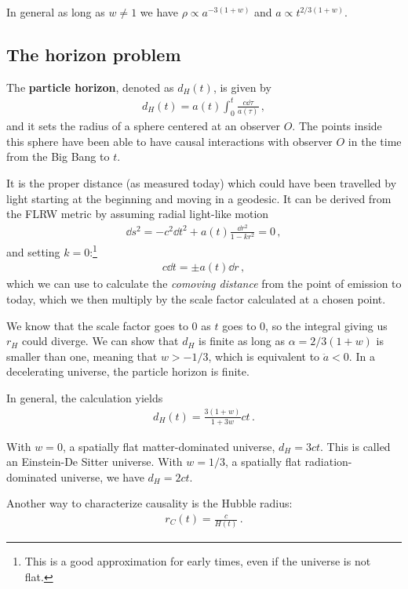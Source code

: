 \documentclass[main.tex]{subfiles}
\begin{document}
In general as long as \(w \neq 1\) we have \(\rho \propto a^{-3(1+w)}\) and \(a \propto t^{2 / 3 (1+w)}\).

\subsection{The horizon problem}

The \textbf{particle horizon}, denoted as \(d_H (t)\), is given by 
%
\begin{align}
d_H (t) = a(t) \int_{0}^{t} \frac{c \dd{\tau }}{a(\tau )}
\,,
\end{align}
%
and it sets the radius of a sphere centered at an observer \(O\). The points inside this sphere have been able to have causal interactions with observer \(O\) in the time from the Big Bang to \(t\).

It is the proper distance (as measured today) which could have been travelled by light starting at the beginning and moving in a geodesic. 
It can be derived from the FLRW metric by assuming radial light-like motion
%
\begin{align}
\dd{s}^2 = - c^2 \dd{t}^2 + a(t)\frac{ \dd{r}^2}{1 - kr^2} = 0
\,,
\end{align}
%
and setting \(k = 0\):\footnote{This is a good approximation for early times, even if the universe is not flat.}
%
\begin{align}
c \dd{t} = \pm  a(t) \dd{r}
\,,
\end{align}
%
which we can use to calculate the \emph{comoving distance} from the point of emission to today, which we then multiply by the scale factor calculated at a chosen point. 

We know that the scale factor goes to 0 as \(t\) goes to 0, so the integral giving us \(r_H\) could diverge. We can show that \(d_H\) is finite as long as \(\alpha = 2 / 3 (1+w)\) is smaller than one, meaning that \(w > - 1/3\), which is equivalent to \(\ddot{a} < 0\).
In a decelerating universe, the particle horizon is finite.

In general, the calculation yields
%
\begin{align}
d_H (t) = \frac{3(1 +w)}{1 + 3w} ct
\,.
\end{align}

With \(w = 0\), a spatially flat matter-dominated universe, \(d_H = 3 ct\). This is called an Einstein-De Sitter universe. 
With \(w = 1/3\), a spatially flat radiation-dominated universe, we have \(d_H = 2 ct\). 

Another way to characterize causality is the Hubble radius: 
%
\begin{align}
r_C(t) = \frac{c}{H(t)}
\,.
\end{align}
\end{document}
